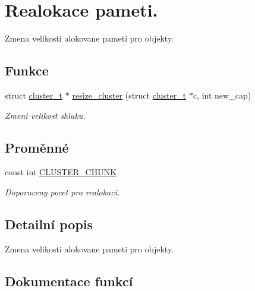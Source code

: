 \hypertarget{group__ZmenaKapacity}{}\section{Realokace pameti.}
\label{group__ZmenaKapacity}


Zmena velikosti alokovane pameti pro objekty.  


\subsection*{Funkce}
\begin{DoxyCompactItemize}
\item 
struct \hyperlink{structcluster__t}{cluster\+\_\+t} $\ast$ \hyperlink{group__ZmenaKapacity_ga0d8702f8bee3bccb81380e012a615a3d}{resize\+\_\+cluster} (struct \hyperlink{structcluster__t}{cluster\+\_\+t} $\ast$c, int new\+\_\+cap)
\begin{DoxyCompactList}\small\item\em Zmeni velikost shluku. \end{DoxyCompactList}\end{DoxyCompactItemize}
\subsection*{Proměnné}
\begin{DoxyCompactItemize}
\item 
const int \hyperlink{group__ZmenaKapacity_gafb09f2bf4615f5ac7a91807aa086d4c3}{C\+L\+U\+S\+T\+E\+R\+\_\+\+C\+H\+U\+NK}
\begin{DoxyCompactList}\small\item\em Doporuceny pocet pro realokaci. \end{DoxyCompactList}\end{DoxyCompactItemize}


\subsection{Detailní popis}
Zmena velikosti alokovane pameti pro objekty. 



\subsection{Dokumentace funkcí}
